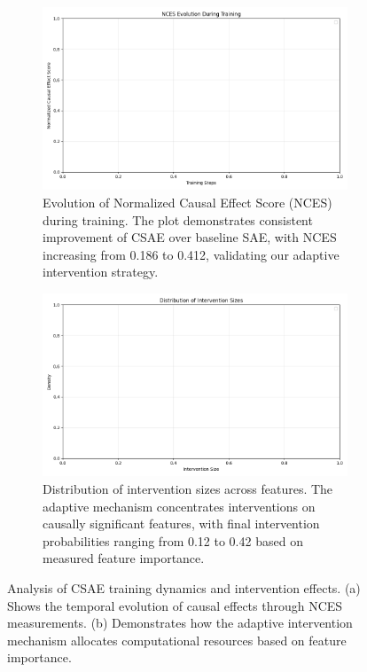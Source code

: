 \documentclass{article} %
\begin{document}
\begin{figure}[t]
    \begin{subfigure}[b]{0.48\textwidth}
        \centering
        \includegraphics[width=\textwidth]{nces_evolution.png}
        \caption{Evolution of Normalized Causal Effect Score (NCES) during training. The plot demonstrates consistent improvement of CSAE over baseline SAE, with NCES increasing from 0.186 to 0.412, validating our adaptive intervention strategy.}
        \label{fig:nces}
    \end{subfigure}
    \hfill
    \begin{subfigure}[b]{0.48\textwidth}
        \centering
        \includegraphics[width=\textwidth]{intervention_distribution.png}
        \caption{Distribution of intervention sizes across features. The adaptive mechanism concentrates interventions on causally significant features, with final intervention probabilities ranging from 0.12 to 0.42 based on measured feature importance.}
        \label{fig:interventions}
    \end{subfigure}
    \caption{Analysis of CSAE training dynamics and intervention effects. (a) Shows the temporal evolution of causal effects through NCES measurements. (b) Demonstrates how the adaptive intervention mechanism allocates computational resources based on feature importance.}
    \label{fig:results}
\end{figure}
\end{document}
